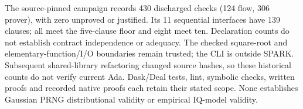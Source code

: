 The source-pinned campaign records 430 discharged checks (124 flow,
306 prover), with zero unproved or justified. Its 11 sequential interfaces
have 139 clauses; all meet the five-clause floor and eight meet ten.
Declaration counts do not establish contract independence or adequacy.
The checked square-root and elementary-function/I/O boundaries remain
trusted; the CLI is outside SPARK. Subsequent shared-library refactoring
changed source hashes, so these historical counts do not verify current
Ada. Dask/Deal tests, lint, symbolic checks, written proofs and recorded
native proofs each retain their stated scope. None establishes Gaussian
PRNG distributional validity or empirical IQ-model validity.
